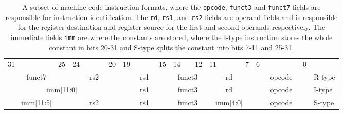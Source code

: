     \begin{table}[h!]
        \scriptsize
        \begin{tabular} %
            {p{0.01mm}p{0.01mm}p{0.01mm}p{0.01mm} p{0.01mm}p{0.01mm}p{0.01mm}p{0.01mm}
                p{0.01mm}p{0.01mm}p{0.01mm}p{0.01mm} p{0.01mm}p{0.01mm}p{0.01mm}p{0.01mm}
                p{0.01mm}p{0.01mm}p{0.01mm}p{0.01mm} p{0.01mm}p{0.01mm}p{0.01mm}p{0.01mm}
                p{0.01mm}p{0.01mm}p{0.01mm}p{0.01mm} p{0.01mm}p{0.01mm}p{0.01mm}p{0.01mm} l}
            \multicolumn{1}{c}{31}&&&&&&
            \multicolumn{1}{c}{25}&
            \multicolumn{1}{c}{24}&&&&
            \multicolumn{1}{c}{20}&
            \multicolumn{1}{c}{19}&&&&
            \multicolumn{1}{c}{15}&
            \multicolumn{1}{c}{14}&&
            \multicolumn{1}{c}{12}&
            \multicolumn{1}{c}{11}&&&&
            \multicolumn{1}{c}{7}&
            \multicolumn{1}{c}{6}&&&&&&
            \multicolumn{1}{c}{0}&
            \\
            \cline{0-31} 
            \multicolumn{7}{|c|}{funct7} &
            \multicolumn{5}{c|}{rs2}&
            \multicolumn{5}{c|}{rs1}&
            \multicolumn{3}{c|}{funct3}&
            \multicolumn{5}{c|}{rd}&
            \multicolumn{7}{c|}{opcode}&
            R-type
            \\
            \cline{0-31} 
            \multicolumn{12}{|c|}{imm[11:0]} &
            \multicolumn{5}{c|}{rs1}&
            \multicolumn{3}{c|}{funct3}&
            \multicolumn{5}{c|}{rd}&
            \multicolumn{7}{c|}{opcode}&
            I-type
            \\
            \cline{0-31} 
            \multicolumn{7}{|c|}{imm[11:5]} &
            \multicolumn{5}{c|}{rs2}&
            \multicolumn{5}{c|}{rs1}&
            \multicolumn{3}{c|}{funct3}&
            \multicolumn{5}{c|}{imm[4:0]}&
            \multicolumn{7}{c|}{opcode}&
            S-type
            \\
            \cline{0-31} 
        \end{tabular}
        \caption{A subset of machine code instruction formats, where the \texttt{opcode}, \texttt{funct3} and \texttt{funct7} fields are responsible for instruction identification. The \texttt{rd}, \texttt{rs1}, and \texttt{rs2} fields are operand fields and is responsible for the register destination and register source for the first and second operands respectively. The immediate fields \texttt{imm} are where the constants are stored, where the I-type instruction stores the whole constant in bits 20-31 and S-type splits the constant into bits 7-11 and 25-31.}
        \label{table:InstructionFormats}
    \end{table}

